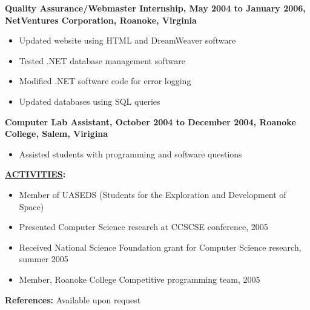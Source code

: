 \documentclass[10pt]{res}
\begin{document}
\begin{resume}
\begin{flushleft}
{\bf Quality Assurance/Webmaster Internship, May 2004 to January 2006, NetVentures Corporation, Roanoke, Virginia}
\end{flushleft}

\begin{itemize}
\setlength{\itemsep}{1pt}
\setlength{\parskip}{0pt}
\setlength{\parsep}{0pt}
\item Updated website using HTML and DreamWeaver software
\item Tested .NET database management software
\item Modified .NET software code for error logging
\item Updated databases using SQL queries
\end{itemize}

\begin{flushleft}
{\bf Computer Lab Assistant, October 2004 to December 2004, Roanoke College, Salem, Virigina}
\end{flushleft}

\begin{itemize}
\setlength{\itemsep}{1pt}
\setlength{\parskip}{0pt}
\setlength{\parsep}{0pt}
\item Assisted students with programming and software questions
\end{itemize}


\begin{flushleft}
{\bf \underline{ACTIVITIES}:}
\end{flushleft}

\begin{itemize}
\setlength{\itemsep}{1pt}
\setlength{\parskip}{0pt}
\setlength{\parsep}{0pt}
\item Member of UASEDS (Students for the Exploration and Development of Space)
\item Presented Computer Science research at CCSCSE conference, 2005
\item Received National Science Foundation grant for Computer Science research, summer 2005
\item Member, Roanoke College Competitive programming team, 2005
\end{itemize}



\begin{flushleft}
{\bf References:} Available upon request
\end{flushleft}

\end{resume}
\end{document}
